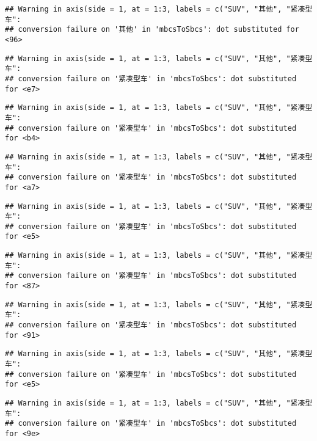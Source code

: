 \documentclass[]{article}
\begin{document}
\begin{verbatim}
## Warning in axis(side = 1, at = 1:3, labels = c("SUV", "其他", "紧凑型车":
## conversion failure on '其他' in 'mbcsToSbcs': dot substituted for <96>
\end{verbatim}

\begin{verbatim}
## Warning in axis(side = 1, at = 1:3, labels = c("SUV", "其他", "紧凑型车":
## conversion failure on '紧凑型车' in 'mbcsToSbcs': dot substituted for <e7>
\end{verbatim}

\begin{verbatim}
## Warning in axis(side = 1, at = 1:3, labels = c("SUV", "其他", "紧凑型车":
## conversion failure on '紧凑型车' in 'mbcsToSbcs': dot substituted for <b4>
\end{verbatim}

\begin{verbatim}
## Warning in axis(side = 1, at = 1:3, labels = c("SUV", "其他", "紧凑型车":
## conversion failure on '紧凑型车' in 'mbcsToSbcs': dot substituted for <a7>
\end{verbatim}

\begin{verbatim}
## Warning in axis(side = 1, at = 1:3, labels = c("SUV", "其他", "紧凑型车":
## conversion failure on '紧凑型车' in 'mbcsToSbcs': dot substituted for <e5>
\end{verbatim}

\begin{verbatim}
## Warning in axis(side = 1, at = 1:3, labels = c("SUV", "其他", "紧凑型车":
## conversion failure on '紧凑型车' in 'mbcsToSbcs': dot substituted for <87>
\end{verbatim}

\begin{verbatim}
## Warning in axis(side = 1, at = 1:3, labels = c("SUV", "其他", "紧凑型车":
## conversion failure on '紧凑型车' in 'mbcsToSbcs': dot substituted for <91>
\end{verbatim}

\begin{verbatim}
## Warning in axis(side = 1, at = 1:3, labels = c("SUV", "其他", "紧凑型车":
## conversion failure on '紧凑型车' in 'mbcsToSbcs': dot substituted for <e5>
\end{verbatim}

\begin{verbatim}
## Warning in axis(side = 1, at = 1:3, labels = c("SUV", "其他", "紧凑型车":
## conversion failure on '紧凑型车' in 'mbcsToSbcs': dot substituted for <9e>
\end{verbatim}
\end{document}
